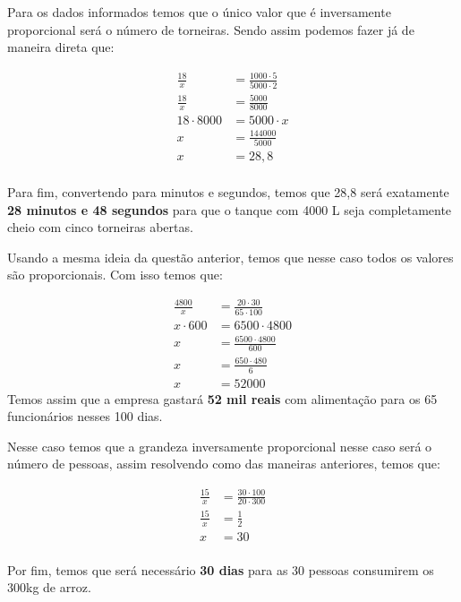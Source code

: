 \documentclass{scrartcl} %
\theoremstyle{geral}
\begin{document}
\begin{multicols}{2}
\setlength\columnseprule{1pt}
\def\columnseprulecolor{\color{corlinha}}%

\begin{question}
Para os dados informados temos que o único valor que é inversamente proporcional será o número de torneiras. Sendo assim podemos fazer já de maneira direta que:

\begin{align*}
\frac{18}{x} &= \frac{1000 \cdot 5}{5000 \cdot 2}\\
\frac{18}{x}&= \frac{5000}{8000}\\
18 \cdot 8000&= 5000 \cdot x \\
x &=  \frac{144 000}{5000}\\
x&= 28,8\\
 \end{align*}
 
Para fim, convertendo para minutos e segundos, temos que 28,8 será exatamente \textbf{28 minutos e 48 segundos} para que o tanque com 4000 L seja completamente cheio com cinco torneiras abertas.
\end{question}

\begin{question}
Usando a mesma ideia da questão anterior, temos que nesse caso todos os valores são proporcionais. Com isso temos que:

\begin{align*}
\frac{4800}{x}&= \frac{20 \cdot 30}{ 65 \cdot 100} \\
x \cdot 600 &= 6500 \cdot 4800\\
x &=  \frac{6500 \cdot 4800}{600}\\
x &= \frac{650 \cdot 480}{6}\\
x & = 52 000
 \end{align*}
 Temos assim que a empresa gastará \textbf{52 mil reais} com alimentação para os 65 funcionários nesses 100 dias.
\end{question}

\begin{question}
Nesse caso temos que a grandeza inversamente proporcional nesse caso será o número de pessoas, assim resolvendo como das maneiras anteriores, temos que:

\begin{align*}
\frac{15}{x} &= \frac{30 \cdot 100}{ 20 \cdot 300} \\
\frac{15}{x}&= \frac{1}{2} \\
x &=  30\\
 \end{align*}

Por fim, temos que será necessário \textbf{30 dias} para as 30 pessoas consumirem os 300kg de arroz.
\end{question}

\end{multicols}
\end{document}
